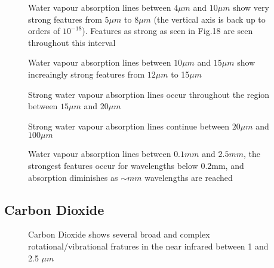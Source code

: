 \documentclass[12pt]{article}
\begin{document}
\vspace*{11.5cm}
\begin{figure}[htb]
\caption{Water vapour absorption lines between $4\mu m$ and $10\mu m$
   show very strong features from $5\mu m$ to 8$\mu m$ (the vertical axis
 is back up to orders of $10^{-18}$). Features as strong as seen in Fig.18 are seen 
throughout this interval}    
\end{figure}
\newpage

\vspace*{11.5cm}
\begin{figure}[htb]
\caption{Water vapour absorption lines between $10\mu m$ and $15\mu m$
   show  increaingly strong features from $12\mu m$ to 15$\mu m$}
\end{figure}
\newpage


\vspace*{11.5cm}
\begin{figure}[htb]
\caption{Strong water vapour absorption lines occur throughout the region 
 between $15\mu m$ and $20\mu m$}
\end{figure}
\newpage

\vspace*{11.5cm}
\begin{figure}[htb]
\caption{Strong water vapour absorption lines continue between $20\mu m$ and $100\mu m$}
\end{figure}
\newpage

\vspace*{11.5cm}
\begin{figure}[htb]
\caption{Water vapour absorption lines between $0.1 mm$ and $2.5 mm$, the
strongest features occur for wavelengths below 0.2mm, and absorption diminishes
as $\sim mm$ wavelengths are reached}
\end{figure}
\newpage



\subsection{Carbon Dioxide}


\vspace*{13.5cm}
\begin{figure}[htb]
\caption{Carbon Dioxide shows several broad and complex rotational/vibrational
 fratures in the near infrared between 1 and 2.5 $\mu m$}
\end{figure}
\newpage
\end{document}
